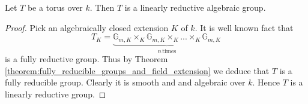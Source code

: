 \begin{corollary}\label{corollary:toruses_are_linearly_reductive}
Let $T$ be a torus over $k$. Then $T$ is a linearly reductive algebraic group.
\end{corollary}
\begin{proof}
Pick an algebraically closed extension $K$ of $k$. It is well known fact that
$$T_K = \underbrace{\mathbb{G}_{m,K}\times_K \mathbb{G}_{m,K}\times_K ...\times_K \mathbb{G}_{m,K}}_{n\,\mathrm{times}}$$
is a fully reductive group. Thus by Theorem \ref{theorem:fully_reducible_groups_and_field_extension} we deduce that $T$ is a fully reducible group. Clearly it is smooth and and algebraic over $k$. Hence $T$ is a linearly reductive group.
\end{proof}
































































































\small







